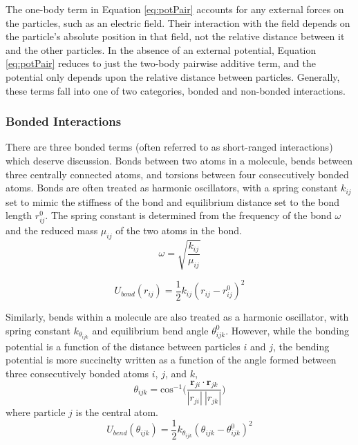 The one-body term in Equation \eqref{eq:potPair} accounts for any
external forces on the particles, such as an electric field. Their
interaction with the field depends on the particle's absolute position
in that field, not the relative distance between it and the other
particles. In the absence of an external potential, Equation
\eqref{eq:potPair} reduces to just the two-body pairwise additive
term, and the potential only depends upon the relative distance
between particles. Generally, these terms fall into one of two
categories, bonded and non-bonded interactions.

\subsubsection{Bonded Interactions}
There are three bonded terms (often referred to as short-ranged
interactions) which deserve discussion. Bonds between two atoms in a
molecule, bends between three centrally connected atoms, and torsions
between four consecutively bonded atoms. Bonds are often treated as
harmonic oscillators, with a spring constant $k_{ij}$ set to mimic the
stiffness of the bond and equilibrium distance set to the bond length
$r_{ij}^0$. The spring constant is determined from the frequency of
the bond $\omega$ and the reduced mass $\mu_{ij}$ of the two atoms in the
bond.
\begin{equation}\label{eq:kij}
\omega = \sqrt{\frac{k_{ij}}{\mu_{ij}} }
\end{equation}

\begin{equation}\label{eq:bonds}
U_{bond}(r_{ij}) = \frac{1}{2} k_{ij} (r_{ij} -r_{ij}^0)^2
\end{equation}

Similarly, bends within a molecule are also treated as a harmonic
oscillator, with spring constant $k_{\theta_{ijk}}$ and equilibrium bend
angle $\theta_{ijk}^0$. However, while the bonding potential is a
function of the distance between particles $i$ and $j$, the bending
potential is more succinclty written as a function of the angle formed between three
consecutively bonded atoms $i$, $j$, and $k$,
\begin{equation}\label{eq:bend}
\theta_{ijk} = \mathrm{cos}^{-1}\Bigg(\frac{\mathbf{r}_{ji} \cdot
  \mathbf{r}_{jk}}{|r_{ji}|~|r_{jk}|}\Bigg)
\end{equation}
where particle $j$ is the central atom. 
\begin{equation}\label{eq:bend2}
U_{bend}(\theta_{ijk}) = \frac{1}{2} k_{\theta_{ijk}} (\theta_{ijk} -
\theta_{ijk}^0)^2
\end{equation}

